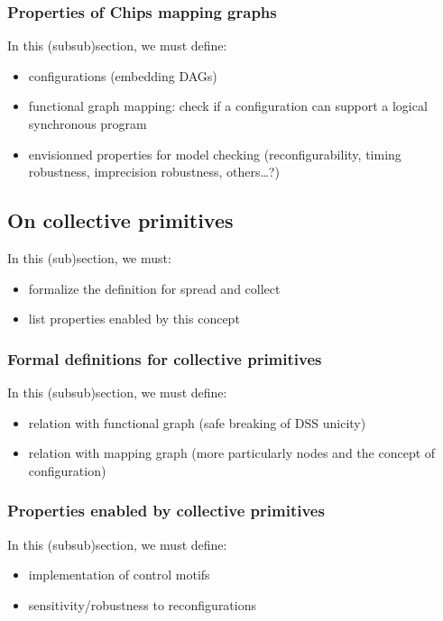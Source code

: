 \documentclass[runningheads]{llncs}
\begin{document}
\subsubsection{Properties of Chips mapping graphs}

In this (subsub)section, we must define:
\begin{itemize}
    \item configurations (embedding DAGs)
    \item functional graph mapping: check if a configuration can support a logical synchronous program
    \item envisionned properties for model checking (reconfigurability, timing robustness, imprecision robustness, others\ldots?)
\end{itemize}

\subsection{On collective primitives}

In this (sub)section, we must:
\begin{itemize}
    \item formalize the definition for spread and collect
    \item list properties enabled by this concept 
\end{itemize}

\subsubsection{Formal definitions for collective primitives}

In this (subsub)section, we must define:
\begin{itemize}
    \item relation with functional graph (safe breaking of DSS unicity)
    \item relation with mapping graph (more particularly nodes and the concept of configuration)
\end{itemize}


\subsubsection{Properties enabled by collective primitives}

In this (subsub)section, we must define:
\begin{itemize}
    \item implementation of control motifs
    \item sensitivity/robustness to reconfigurations
\end{itemize}
\end{document}

